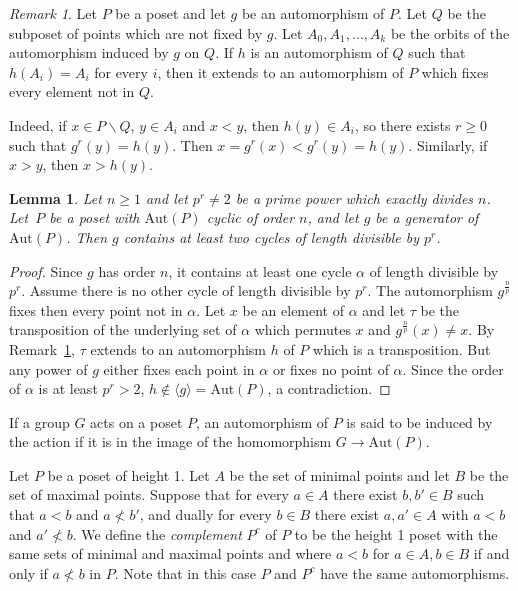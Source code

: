 \documentclass[10pt,a4paper]{amsart}
\newcommand{\aut}{\textrm{Aut}}
\theoremstyle{plain}
\newtheorem{lema}[cdrthm]{Lemma}
\theoremstyle{definition}
\theoremstyle{remark}
\newtheorem{obs}[cdrthm]{Remark}
\begin{document}
\begin{obs} \label{extension}
Let $P$ be a poset and let $g$ be an automorphism of $P$. Let $Q$ be the subposet of points which are not fixed by $g$. Let $A_0,A_1,\ldots, A_k$ be the orbits of the automorphism induced by $g$ on $Q$. If $h$ is an automorphism of $Q$ such that $h(A_i)=A_i$ for every $i$, then it extends to an automorphism of $P$ which fixes every element not in $Q$.

Indeed, if $x\in P\smallsetminus Q$, $y\in A_i$ and $x<y$, then $h(y)\in A_i$, so there exists $r\ge 0$ such that $g^r(y)=h(y)$. Then $x=g^r(x)<g^r(y)=h(y)$. Similarly, if $x>y$, then $x>h(y)$.
\end{obs}

\begin{lema} \label{dos}
Let $n\ge 1$ and let $p^r\neq 2$ be a prime power which exactly divides $n$. Let~$P$ be a poset with $\aut(P)$ cyclic of order $n$, and let $g$ be a generator of $\aut (P)$. Then $g$ contains at least two cycles of length divisible by $p^r$. 
\end{lema}
\begin{proof}
Since $g$ has order $n$, it contains at least one cycle $\alpha$ of length divisible by $p^r$. Assume there is no other cycle of length divisible by $p^r$. The automorphism $g^{\frac{n}{p}}$ fixes then every point not in $\alpha$. Let $x$ be an element of $\alpha$ and let $\tau$ be the transposition of the underlying set of $\alpha$ which permutes $x$ and $g^{\frac{n}{p}}(x)\neq x$. By Remark~\ref{extension}, $\tau$ extends to an automorphism $h$ of $P$ which is a transposition. But any power of $g$ either fixes each point in $\alpha$ or fixes no point of $\alpha$. Since the order of $\alpha$ is at least $p^r>2$, $h \notin \langle g\rangle=\aut(P)$, a contradiction.  
\end{proof}

If a group $G$ acts on a poset $P$, an automorphism of $P$ is said to be induced by the action if it is in the image of the homomorphism $G\to \aut(P)$. 

Let $P$ be a poset of height 1. Let $A$ be the set of minimal points and let $B$ be the set of maximal points. Suppose that for every $a\in A$ there exist $b,b'\in B$ such that $a<b$ and $a\nless b'$, and dually for every $b\in B$ there exist $a,a'\in A$ with $a<b$ and $a'\nless b$. We define the \emph{complement} $P^c$ of $P$ to be the height 1 poset with the same sets of minimal and maximal points and where $a<b$ for $a\in A, b\in B$ if and only if $a\nless b$ in $P$. Note that in this case $P$ and $P^c$ have the same automorphisms.
\end{document}
